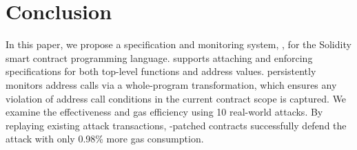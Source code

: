 \section{Conclusion}

In this paper, we propose a specification and monitoring system, \lang,
for the Solidity smart contract programming language.
\lang supports attaching and enforcing specifications for both
top-level functions and address values.
\lang persistently monitors address calls via a whole-program
transformation, which ensures any violation of address call conditions
in the current contract scope is captured.
We examine the effectiveness and gas efficiency using 10 real-world attacks.
By replaying existing attack transactions, \lang-patched contracts successfully
defend the attack with only 0.98\% more gas consumption.

